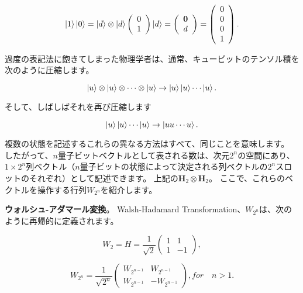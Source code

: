 \begin{equation}
\label{53}
\ket{1} \ket{0} =  \ket{d} \otimes \ket{d}
\left( \begin{array}{ccc}
 0  \\
 1 
\end{array} \right) 
\ket{d}
=
\left( \begin{array}{ccc}
 \mathbf{0}  \\
 d
\end{array} \right) 
=
\left( \begin{array}{ccc}
 0  \\
 0  \\
 0  \\
 1
\end{array} \right) .
\end{equation}

過度の表記法に飽きてしまった物理学者は、通常、キュービットのテンソル積を次のように圧縮します。


\begin{equation}
\label{54}
\ket{u} \otimes \ket{u} \otimes \cdots \otimes \ket{u}
\to
\ket{u} \ket{u} \cdots \ket{u}.
\end{equation}

そして、しばしばそれを再び圧縮します

\begin{equation}
\label{55}
\ket{u} \ket{u}  \cdots \ket{u}
\to
\ket{uu \cdots u}.
\end{equation}

複数の状態を記述するこれらの異なる方法はすべて、同じことを意味します。 したがって、$n$量子ビットベクトルとして表される数は、次元$2^n$の空間にあり、$1× 2^n$列ベクトル（$n$量子ビットの状態によって決定される列ベクトルの$2^n$スロットのそれぞれ）として記述できます。 上記の$\mathbf{H}_2 \otimes \mathbf{H}_2 $。 ここで、これらのベクトルを操作する行列$W_{2^n}$を紹介します。


\textbf{ウォルシュ-アダマール変換}。 Walsh-Hadamard Transformation、$W_{2^n}$は、次のように再帰的に定義されます。 

\begin{equation}
\label{56}
W_2 = H =
\frac{1}{\sqrt{2}}
\left( \begin{array}{ccc}
 1 & 1  \\
 1 & -1
\end{array} \right) ,
\end{equation}


\begin{equation}
\label{57}
W_{2^n} = 
\frac{1}{\sqrt{2^n}}
\left( \begin{array}{ccc}
 W_{2^{n-1}} & W_{2^{n-1}}  \\
 W_{2^{n-1}} & -W_{2^{n-1}}
\end{array} \right),  for \quad n > 1 .
\end{equation}


